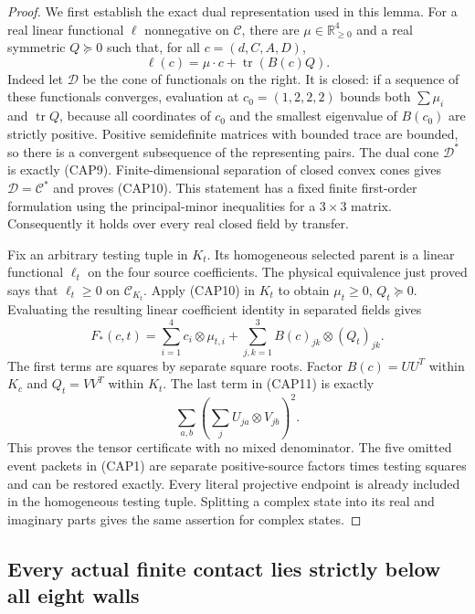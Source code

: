 \begin{proof}
We first establish the exact dual representation used in this lemma.
For a real linear functional $\ell$ nonnegative on $\mathcal C$,
there are $\mu\in\mathbb R_{\geq0}^4$ and a real symmetric
$Q\succeq0$ such that, for all $c=(d,C,A,D)$,
\[
\ell(c)=\mu\cdot c+\operatorname{tr}(B(c)Q).
\tag{CAP10}
\]
Indeed let $\mathcal D$ be the cone of functionals on the right.  It
is closed: if a sequence of these functionals converges, evaluation
at $c_0=(1,2,2,2)$ bounds both $\sum\mu_i$ and
$\operatorname{tr}Q$, because all coordinates of $c_0$ and the
smallest eigenvalue of $B(c_0)$ are strictly positive.  Positive
semidefinite matrices with bounded trace are bounded, so there is a
convergent subsequence of the representing pairs.  The dual cone
$\mathcal D^*$ is exactly (CAP9).  Finite-dimensional separation of
closed convex cones gives $\mathcal D=\mathcal C^*$ and proves
(CAP10).  This statement has a fixed finite first-order formulation
using the principal-minor inequalities for a $3\times3$ matrix.
Consequently it holds over every real closed field by transfer.

Fix an arbitrary testing tuple in $K_t$.  Its homogeneous selected
parent is a linear functional $\ell_t$ on the four source
coefficients.  The physical equivalence just proved says that
$\ell_t\geq0$ on $\mathcal C_{K_t}$.  Apply (CAP10) in $K_t$ to
obtain $\mu_t\geq0$, $Q_t\succeq0$.  Evaluating the resulting
linear coefficient identity in separated fields gives
\[
F_*(c,t)=\sum_{i=1}^4c_i\otimes\mu_{t,i}
 +\sum_{j,k=1}^3 B(c)_{jk}\otimes(Q_t)_{jk}.
\tag{CAP11}
\]
The first terms are squares by separate square roots.  Factor
$B(c)=UU^T$ within $K_c$ and $Q_t=VV^T$ within $K_t$.  The last
term in (CAP11) is exactly
\[
\sum_{a,b}\left(\sum_jU_{ja}\otimes V_{jb}\right)^2.
\]
This proves the tensor certificate with no mixed denominator.  The
five omitted event packets in (CAP1) are separate positive-source
factors times testing squares and can be restored exactly.  Every
literal projective endpoint is already included in the homogeneous
testing tuple.  Splitting a complex state into its real and imaginary
parts gives the same assertion for complex states.
\end{proof}

\subsection{Every actual finite contact lies strictly below all eight walls}

